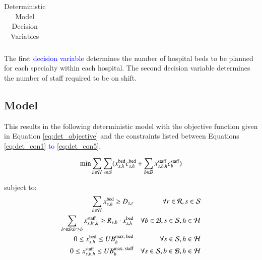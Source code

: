\documentclass[../thesis.tex]{subfiles}
\begin{document}
{\begin{table}[h!]
{\begin{tabular}{cl}
    \end{tabular}}
    \caption{Deterministic Model Decision Variables}
    \label{tab:dmdv}
\end{table}

The first \textcolor{blue}{decision variable} determines the number of hospital beds to be planned for each specialty within each hospital. The second decision variable determines the number of staff required to be on shift.

\subsection{Model}
This results in the following deterministic model with the objective function given in Equation \eqref{eq:det_objective} and the constraints listed between Equations \eqref{eq:det_con1} \textcolor{blue}{to} \eqref{eq:det_con5}.


\begin{equation}\label{eq:det_objective}
    \text{min} \sum_{h\in\mathcal{H}}\sum_{s\in\mathcal{S}}(x^\textnormal{bed}_{s,h}c^\textnormal{bed}_{s,h} + \sum_{b\in\mathcal{B}}x^\textnormal{staff}_{s,b,h}c^\textnormal{staff}_{b})
\end{equation}


subject to:
\begin{align}
    \sum_{h\in\mathcal{H}} x^\textnormal{bed}_{s,h}\geq D_{s,r} & & \forall r \in \mathcal{R}, s \in \mathcal{S} \label{eq:det_con1}\\
    \sum\limits_{b'\in\mathcal{B}: b'\geq b} x^\textnormal{staff}_{s,b',h} \geq R_{s,b} \cdot x^\textnormal{bed}_{s,h} & & \forall b \in \mathcal{B}, s \in \mathcal{S}, h \in \mathcal{H}\label{eq:det_con3}\\
    0 \leq x^\textnormal{bed}_{s,h}\leq UB^\textnormal{max, bed}_h & &\forall s \in \mathcal{S}, h \in \mathcal{H}\label{eq:det_con4}\\
    0 \leq x^\textnormal{staff}_{s,b,h} \leq UB^\textnormal{max, staff}_{b}& & \forall s \in \mathcal{S}, b \in \mathcal{B}, h \in \mathcal{H}\label{eq:det_con5}
\end{align}

}
\end{document}
